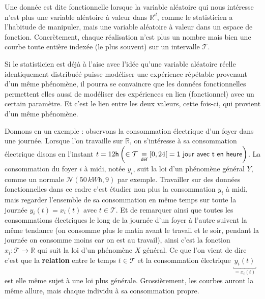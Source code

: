 
Une donnée est dite fonctionnelle lorsque la variable aléatoire qui nous intéresse n'est plus une variable aléatoire à valeur dans $\mathds R^d$, comme le statisticien a l'habitude de manipuler, mais une variable aléatoire à valeur dans un espace de fonction. Concrètement, chaque réalisation n'est plus un nombre mais bien une courbe toute entière indexée (le plus souvent) sur un intervalle $\mathcal T$. 

\smallskip

Si le statisticien est déjà à l'aise avec l'idée qu'une variable aléatoire réelle identiquement distribuéé puisse modéliser une expérience répétable provenant d'un même phénomène, il pourra se convaincre que les données fonctionnelles permettent elles aussi de modéliser des expériences en lien (fonctionnel) avec un certain paramètre. Et c'est le lien entre les deux valeurs, cette fois-ci, qui provient d'un même phénomène. 

\smallskip

Donnons en un exemple : observons la consommation électrique d'un foyer dans une journée. Lorsque l'on travaille sur $\mathds R$, on s'intéresse à sa consommation électrique disons en l'instant $t = 12\mathsf{h} \left(\in \mathcal T \, \isdef [0,24[ \; = \textsf{1 jour avec t en heure}\right)$. La consommation du foyer $i$ à midi, notée $y_i$, suit la loi d'un phénomène général $Y$, comme un normale $\mathcal N\left( 50 \, kW\mathsf h, 9\right)$ par exemple. Travailler sur des données fonctionnelles dans ce cadre c'est étudier non plus la consommation $y_i$ à midi, mais regarder l'ensemble de sa consommation en même temps sur toute la journée $y_i(t) = x_i(t)$ avec $t \in \mathcal T$. Et de remarquer ainsi que toutes les consommations électriques le long de la journée d'un foyer à l'autre suivent la même tendance (on consomme plus le matin avant le travail et le soir, pendant la journée on consomme moins car on est au travail), ainsi c'est la fonction $x_i : \mathcal T \longrightarrow \mathds R$ qui suit la loi d'un phénomène $X$ général. Ce que l'on vient de dire c'est que la \textbf{relation} entre le temps $t \in \mathcal T$ et la consommation électrique $\underbracket{\, y_i(t) \,}_{= x_i(t)}$ est elle même sujet à une loi plus générale. Grossièrement, les courbes auront la même allure, mais chaque individu à sa consommation propre.

\bigskip

